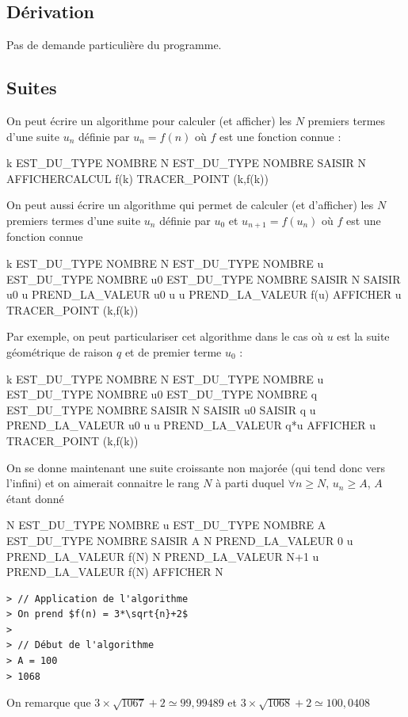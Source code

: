 \subsection{Dérivation}
Pas de demande particulière du programme.
\subsection{Suites}
On peut écrire un algorithme pour calculer (et afficher) les $N$ premiers termes d'une suite $u_n$ définie par $u_n = f(n)$ où $f$ est une fonction connue : 

\begin{algobox}
\Variables
\Ligne k EST\_DU\_TYPE NOMBRE
\Ligne N EST\_DU\_TYPE NOMBRE
\DebutAlgo
\Ligne SAISIR N
\DebutPour
\Ligne AFFICHERCALCUL f(k)
\Ligne TRACER\_POINT (k,f(k))
\FinPour
\FinAlgo

\end{algobox}
On peut aussi écrire un algorithme qui permet de calculer (et d'afficher) les $N$ premiers termes d'une suite $u_n$ définie par $u_0$ et $u_{n+1} = f(u_n)$ où $f$ est une fonction connue
\begin{algobox}
\Variables
\Ligne k EST\_DU\_TYPE NOMBRE
\Ligne N EST\_DU\_TYPE NOMBRE
\Ligne u EST\_DU\_TYPE NOMBRE
\Ligne u0 EST\_DU\_TYPE NOMBRE
\DebutAlgo
\Ligne SAISIR N
\Ligne SAISIR u0
\Ligne u PREND\_LA\_VALEUR u0
\DebutPour
\Ligne u u PREND\_LA\_VALEUR f(u)
\Ligne AFFICHER u
\Ligne TRACER\_POINT (k,f(k))
\FinPour
\FinAlgo

\end{algobox}
Par exemple, on peut particulariser cet algorithme dans le cas où $u$ est la suite géométrique de raison $q$ et de premier terme $u_0$ : 
\begin{algobox}
\Variables
\Ligne k EST\_DU\_TYPE NOMBRE
\Ligne N EST\_DU\_TYPE NOMBRE
\Ligne u EST\_DU\_TYPE NOMBRE
\Ligne u0 EST\_DU\_TYPE NOMBRE
\Ligne q EST\_DU\_TYPE NOMBRE
\DebutAlgo
\Ligne SAISIR N
\Ligne SAISIR u0
\Ligne SAISIR q
\Ligne u PREND\_LA\_VALEUR u0
\DebutPour
\Ligne u u PREND\_LA\_VALEUR q*u
\Ligne AFFICHER u
\Ligne TRACER\_POINT (k,f(k))
\FinPour
\FinAlgo
\end{algobox}

On se donne maintenant une suite croissante non majorée (qui tend donc vers l'infini) et on aimerait connaitre le rang $N$ à parti duquel $\forall n \geq N $, $u_n \geq A$, $A$ étant donné
\begin{algobox}
\Variables
\Ligne N EST\_DU\_TYPE NOMBRE
\Ligne u EST\_DU\_TYPE NOMBRE
\Ligne A EST\_DU\_TYPE NOMBRE
\DebutAlgo
\Ligne SAISIR A
\Ligne N PREND\_LA\_VALEUR 0
\Ligne u PREND\_LA\_VALEUR f(N)
\DebutTantQue
\Ligne N PREND\_LA\_VALEUR N+1
\Ligne u PREND\_LA\_VALEUR f(N)
\FinTantQue
\Ligne AFFICHER N
\FinAlgo

\end{algobox}
\begin{verbatim}
> // Application de l'algorithme
> On prend $f(n) = 3*\sqrt{n}+2$
>
> // Début de l'algorithme
> A = 100
> 1068
\end{verbatim}
On remarque que $3 \times \sqrt{1067} +2 \simeq 99,99489$ et $3 \times \sqrt{1068} +2 \simeq 100,0408$

